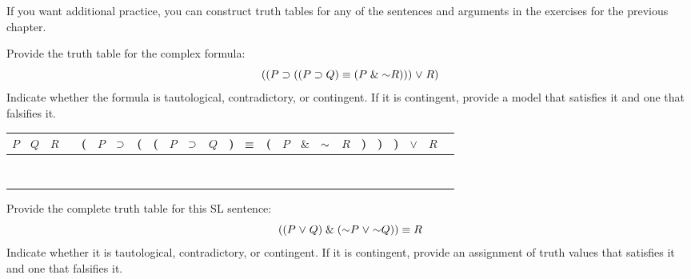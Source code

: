 

If you want additional practice, you can construct truth tables for any of the sentences and arguments in the exercises for the previous chapter.



\problempart
\label{HW2.E}
Provide the truth table for the complex formula:
$$((P \eif (( P \eif Q) \eiff (P \eand \enot R))) \eor R)$$
Indicate whether the formula is tautological, contradictory, or contingent. If it is contingent, provide a model that satisfies it and one that falsifies it.


\begin{tabular}{@{ }c@{ }@{ }c@{ }@{ }c | c@{ }@{}c@{}@{ }c@{ }@{ }c@{ }@{}c@{}@{}c@{}@{ }c@{ }@{ }c@{ }@{ }c@{ }@{}c@{}@{ }c@{ }@{}c@{}@{ }c@{ }@{ }c@{ }@{ }c@{ }@{ }c@{ }@{}c@{}@{}c@{}@{}c@{}@{ }c@{ }@{ }c@{ }@{ }c}
$P$ & $Q$ & $R$ &  & ( & $P$ & $\supset $ & ( & ( & $P$ & $\supset $ & $Q$ & ) & $\equiv $ & ( & $P$ & $\&$ & $\enot$ & $R$ & ) & ) & ) & $\lor$ & $R$ & \\
\hline 
 &  &  &  &  &  &  &  &  &  &  &  &  &  &  &  &  &  &  &  &  &  &  & & \\
 &  &  &  &  &  &  &  &  &  &  &  &  &  &  &  &  &  &  &  &  &  &  & & \\
  &  &  &  &  &  &  &  &  &  &  &  &  &  &  &  &  &  &  &  &  &  &  & & \\
 &  &  &  &  &  &  &  &  &  &  &  &  &  &  &  &  &  &  &  &  &  &  & & \\
 &  &  &  &  &  &  &  &  &  &  &  &  &  &  &  &  &  &  &  &  &  &  & & \\
  &  &  &  &  &  &  &  &  &  &  &  &  &  &  &  &  &  &  &  &  &  &  & & \\
 &  &  &  &  &  &  &  &  &  &  &  &  &  &  &  &  &  &  &  &  &  &  & & \\
  &  &  &  &  &  &  &  &  &  &  &  &  &  &  &  &  &  &  &  &  &  &  & & \\
\end{tabular}




\problempart
\label{HW3.A}
Provide the complete truth table for this SL sentence:
$$((P \eor Q) \eand (\enot P \eor \enot Q)) \eiff R$$
Indicate whether it is tautological, contradictory, or contingent. If it is contingent, provide an assignment of truth values that satisfies it and one that falsifies it.



